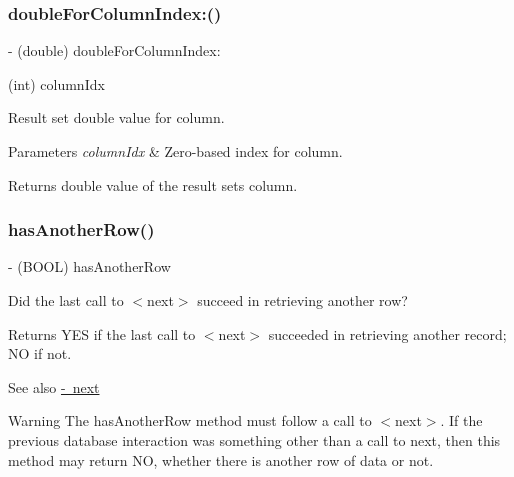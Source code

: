 \subsubsection{\texorpdfstring{double\+For\+Column\+Index\+:()}{doubleForColumnIndex:()}}
{\footnotesize\ttfamily -\/ (double) double\+For\+Column\+Index\+: \begin{DoxyParamCaption}\item[{(int)}]{column\+Idx }\end{DoxyParamCaption}}

Result set {\ttfamily double} value for column.


\begin{DoxyParams}{Parameters}
{\em column\+Idx} & Zero-\/based index for column.\\
\hline
\end{DoxyParams}
\begin{DoxyReturn}{Returns}
{\ttfamily double} value of the result set\textquotesingle{}s column. 
\end{DoxyReturn}
\mbox{\label{interface_o_p_t_l_y_f_m_d_b_result_set_aba289dd61c9163a368b2898ab3aea0ae}} 
\subsubsection{\texorpdfstring{has\+Another\+Row()}{hasAnotherRow()}}
{\footnotesize\ttfamily -\/ (B\+O\+OL) has\+Another\+Row \begin{DoxyParamCaption}{ }\end{DoxyParamCaption}}

Did the last call to {\ttfamily $<$next$>$} succeed in retrieving another row?

\begin{DoxyReturn}{Returns}
{\ttfamily Y\+ES} if the last call to {\ttfamily $<$next$>$} succeeded in retrieving another record; {\ttfamily NO} if not.
\end{DoxyReturn}
\begin{DoxySeeAlso}{See also}
\mbox{\hyperlink{interface_o_p_t_l_y_f_m_d_b_result_set_aed75988ef0079729eca9fcfdef92ec07}{-\/ next}}
\end{DoxySeeAlso}
\begin{DoxyWarning}{Warning}
The {\ttfamily has\+Another\+Row} method must follow a call to {\ttfamily $<$next$>$}. If the previous database interaction was something other than a call to {\ttfamily next}, then this method may return {\ttfamily NO}, whether there is another row of data or not. 
\end{DoxyWarning}
\mbox{\label{interface_o_p_t_l_y_f_m_d_b_result_set_ae668c33cb56f14743d1daddca94ea3d1}} 
